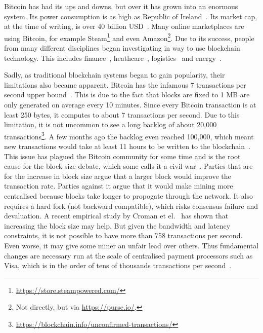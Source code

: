 Bitcoin has had its ups and downs, but over it has grown into an enormous system.
Its power consumption is as high as Republic of Ireland~\cite{o2014bitcoin}.
Its market cap, at the time of writing, is over 40 billion USD~\cite{bitcoinmarketcap}.
Many online marketplaces are using Bitcoin, for example Steam\footnote{\url{https://store.steampowered.com/}} and even Amazon\footnote{Not directly, but via \url{https://purse.io/}.}.
Due to its success, people from many different disciplines began investigating in way to use blockchain technology.
This includes finance~\cite{finance}, heathcare~\cite{healthcare}, logistics~\cite{supplychain} and energy~\cite{energy}.

Sadly, as traditional blockchain systems began to gain popularity,
their limitations also became apparent.
Bitcoin has the infamous 7 transactions per second upper bound~\cite{vukolic2015quest}.
This is due to the fact that blocks are fixed to 1 MB are only generated on average every 10 minutes.
Since every Bitcoin transaction is at least 250 bytes, it computes to about 7 transactions per second.
Due to this limitation, it is not uncommon to see a long backlog of about 20,000 transactions\footnote{\url{https://blockchain.info/unconfirmed-transactions/}}.
A few months ago the backlog even reached 100,000, which meant new transactions would take at least 11 hours to be written to the blockchain~\cite{bitcoinbacklog}.
This issue has plagued the Bitcoin community for some time and is the root cause for the block size debate, which some calls it a civil war~\cite{bitcoincivilwar}.
Parties that are for the increase in block size argue that a larger block would improve the transaction rate.
Parties against it argue that it would make mining more centralised because blocks take longer to propogate through the network.
It also requires a hard fork (not backward compatible), which risks consensus failure and devaluation.
A recent empirical study by Croman et el.~\cite{croman2016scaling} has shown that increasing the block size may help.
But given the bandwidth and latency constraints,
it is not possible to have more than 758 transactions per second.
Even worse, it may give some miner an unfair lead over others.
Thus fundamental changes are necessary run at the scale of centralised payment processors such as Visa,
which is in the order of tens of thousands transactions per second~\cite{visa}.

